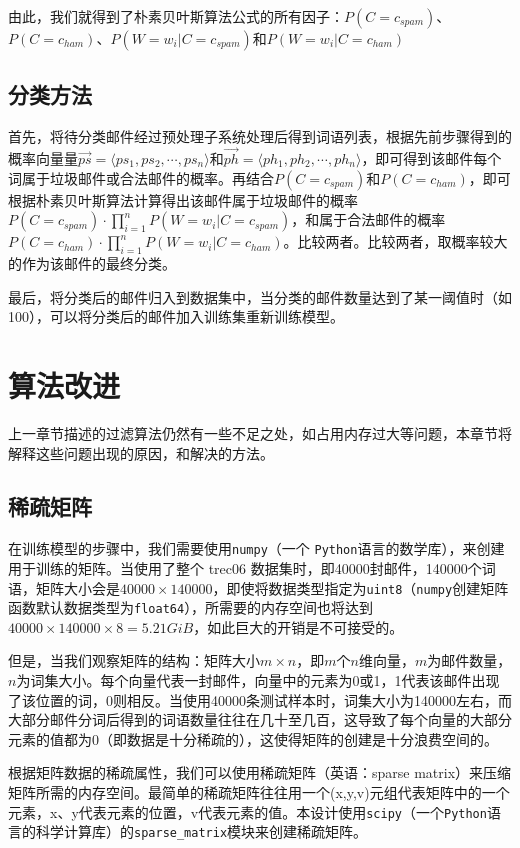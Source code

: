 \documentclass[UTF8,zihao=-4]{ctexart}
\begin{document}
	由此，我们就得到了朴素贝叶斯算法公式的所有因子：$P(C=c_{spam})$、$P(C=c_{ham})$、$P(W=w_i|C=c_{spam})$和$P(W=w_i|C=c_{ham})$
	
\subsection{分类方法}
	首先，将待分类邮件经过预处理子系统处理后得到词语列表，根据先前步骤得到的概率向量量$\vec{ps}=\langle ps_1,ps_2,\cdots,ps_n\rangle$和$\vec{ph}=\langle ph_1,ph_2,\cdots,ph_n\rangle$，即可得到该邮件每个词属于垃圾邮件或合法邮件的概率。再结合$P(C=c_{spam})$和$P(C=c_{ham})$，即可根据朴素贝叶斯算法计算得出该邮件属于垃圾邮件的概率$P(C=c_{spam}) \cdot \prod\limits_{i=1}^{n} P(W=w_i|C=c_{spam})$，和属于合法邮件的概率$P(C=c_{ham}) \cdot \prod\limits_{i=1}^{n} P(W=w_i|C=c_{ham})$。比较两者。比较两者，取概率较大的作为该邮件的最终分类。
	
	最后，将分类后的邮件归入到数据集中，当分类的邮件数量达到了某一阈值时（如100），可以将分类后的邮件加入训练集重新训练模型。

\section{算法改进}
	上一章节描述的过滤算法仍然有一些不足之处，如占用内存过大等问题，本章节将解释这些问题出现的原因，和解决的方法。
\subsection{稀疏矩阵}
	在训练模型的步骤中，我们需要使用\texttt{numpy}（一个 \texttt{Python}语言的数学库），来创建用于训练的矩阵。当使用了整个 trec06 数据集时，即40000封邮件，140000个词语，矩阵大小会是$40000\times140000$，即使将数据类型指定为\texttt{uint8}（\texttt{numpy}创建矩阵函数默认数据类型为\texttt{float64}），所需要的内存空间也将达到$40000\times140000\times8=5.21GiB$，如此巨大的开销是不可接受的。
	
	但是，当我们观察矩阵的结构：矩阵大小$m\times n$，即$m$个$n$维向量，$m$为邮件数量，$n$为词集大小。每个向量代表一封邮件，向量中的元素为0或1，1代表该邮件出现了该位置的词，0则相反。当使用40000条测试样本时，词集大小为140000左右，而大部分邮件分词后得到的词语数量往往在几十至几百，这导致了每个向量的大部分元素的值都为0（即数据是十分稀疏的），这使得矩阵的创建是十分浪费空间的。
	
	根据矩阵数据的稀疏属性，我们可以使用稀疏矩阵（英语：sparse matrix）来压缩矩阵所需的内存空间。最简单的稀疏矩阵往往用一个(x,y,v)元组代表矩阵中的一个元素，x、y代表元素的位置，v代表元素的值。本设计使用\texttt{scipy}（一个\texttt{Python}语言的科学计算库）的\texttt{sparse\_matrix}模块来创建稀疏矩阵。
\end{document}
